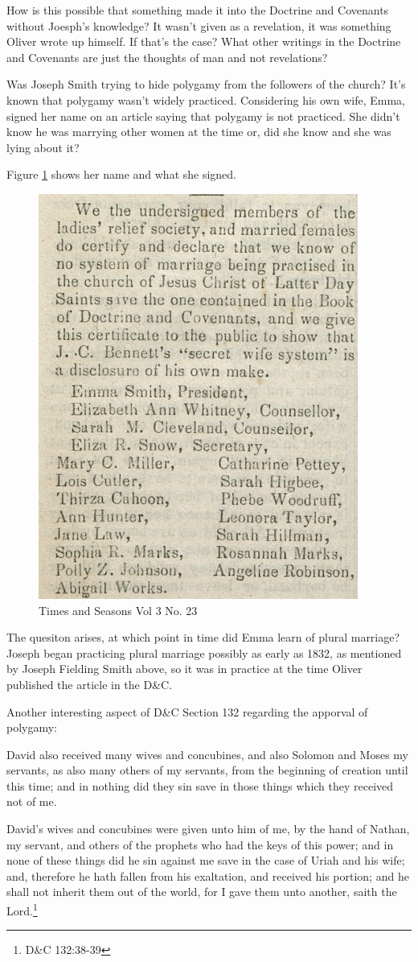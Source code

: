 How is this possible that something made it into the Doctrine and Covenants without
Joesph's knowledge? It wasn't given as a revelation, it was something Oliver wrote up
himself. If that's the case? What other writings in the Doctrine and Covenants are
just the thoughts of man and not revelations?

Was Joseph Smith trying to hide polygamy from the followers of the church? It's known
that polygamy wasn't widely practiced. Considering his own wife, Emma, signed her
name on an article saying that polygamy is not practiced. She didn't know he was
marrying other women at the time or, did she know and she was lying about it?

Figure \ref{fig:tas1} shows her name and what she signed.

\begin{figure}[h!]
  \centering
  \includegraphics[width=0.4\linewidth]{articles/images/polygamy.png}
  \caption{Times and Seasons Vol 3 No. 23}
  \label{fig:tas1}
\end{figure}

The quesiton arises, at which point in time did Emma learn of plural marriage? 
Joseph began practicing plural marriage possibly as early as 1832, as mentioned by
Joseph Fielding Smith above, so it was in practice at the time Oliver published the
article in the D\&C.

Another interesting aspect of D\&C Section 132 regarding the apporval of polygamy:

\begin{displayquote}
David also received many wives and concubines, and also Solomon and Moses my 
servants, as also many others of my servants, from the beginning of creation until 
this time; and in nothing did they sin save in those things which they received 
not of me.

David’s wives and concubines were given unto him of me, by the hand of Nathan, 
my servant, and others of the prophets who had the keys of this power; and in none of 
these things did he sin against me save in the case of Uriah and his wife; and, 
therefore he hath fallen from his exaltation, and received his portion; and he 
shall not inherit them out of the world, for I gave them unto another, saith the 
Lord.\footnote{D\&C 132:38-39}
\end{displayquote}


